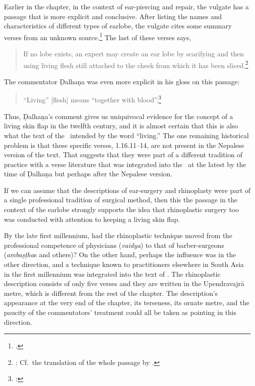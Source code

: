 Earlier in the chapter, in the context of ear-piercing and repair, the vulgate has
a passage that is more explicit and conclusive.  After listing the names and
characteristics of different types of earlobe, the vulgate cites some summary
verses from an unknown source.\footnote{.}  The last of these
    verses says,
    \begin{quote}
            If no lobe exists, an expert may create an ear lobe by scarifying and
then using living flesh still attached to the cheek from which it has
been sliced.\footnote{:  
    Cf.\ the translation of the whole passage by \citet{wuja-2003}.}
    \end{quote}
The commentator Ḍalhaṇa was even more explicit in his gloss on this passage:
\begin{quote}
    “Living” [flesh] means “together with blood”.\footnote{:
    }
\end{quote}
Thus, Ḍalhaṇa's comment gives us uniquivocal evidence for the concept of a living
skin flap in the twelfth century, and it is almost certain that this is also what
the text of the \SS\ intended by the word “living.”  The one remaining historical
problem is that these specific verses, 1.16.11--14, are not present in the
Nepalese version of the text.  That suggests that they were part of a different
tradition of practice with a verse literature that was integrated into the \SS\ at the
latest by the time of Ḍalhaṇa but perhaps after the Nepalese version.

If we can assume that the descriptions of ear-surgery and rhinoplasty were part of
a single professional tradition of surgical method, then this the passage in the
context of the earlobe strongly supports the idea that rhinoplastic surgery too was
conducted with attention to keeping a living skin flap.

By the late first millennium, had the rhinoplastic technique moved from the
professional competence of physicians (\emph{vaidya}) to that of barber-surgeons
(\emph{ambaṣṭha}s and others)?  On the other hand, perhaps the influence was in
the other direction, and a technique known to practitioners elsewhere in South
Asia in the first millennium was integrated into the text of \SS. The rhinoplastic
description consists of only five verses and they are written in the Upendravajrā
metre, which is different from the rest of the chapter.  The description's
appearance at the very end of the chapter, its terseness, its ornate metre, and
the paucity of the commentators' treatment could all be taken as pointing in this
direction.

